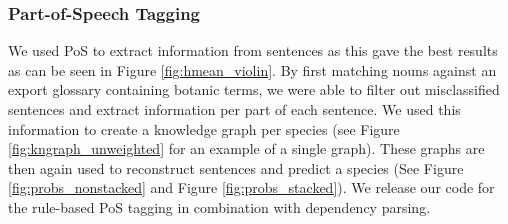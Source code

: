 \documentclass[a4paper, 12pt, oneside]{book} %
\begin{document}
\subsubsection{Part-of-Speech Tagging}
We used PoS to extract information from sentences as this gave the best results as can be seen in Figure \ref{fig:hmean_violin}.
By first matching nouns against an export glossary containing botanic terms, we were able to filter out misclassified sentences and extract information per part of each sentence.
We used this information to create a knowledge graph per species (see Figure \ref{fig:kngraph_unweighted} for an example of a single graph). 
These graphs are then again used to reconstruct sentences and predict a species (See Figure \ref{fig:probs_nonstacked} and Figure \ref{fig:probs_stacked}).
We release our code for the rule-based PoS tagging in combination with dependency parsing.
\end{document}
